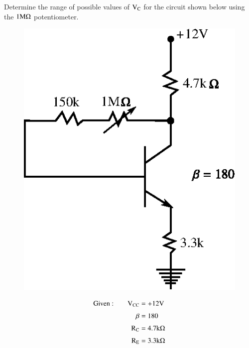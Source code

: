 \begin{problem}\label{prob3.8}
Determine the range of possible values of $\textrm{V}_{\textrm{C}}$ for the circuit shown below using the $1\textrm{M}\Omega$ potentiometer.

\noindent
\begin{minipage}[c]{7cm}
\begin{figure}[H]
\centering
\includegraphics[scale=.87]{chap3/fig3.17.eps}
\end{figure}
\end{minipage}
\quad
\begin{minipage}[c]{7cm}
\begin{align*}
\text{Given~:}\qquad \textrm{V}_{\text{CC}} &= +12\textrm{V}\\[3pt]
\beta &= 180\\[3pt]
\textrm{R}_{\textrm{C}} &= 4.7\textrm{k}\Omega\\[3pt]
\textrm{R}_{\textrm{E}} &= 3.3\textrm{k}\Omega
\end{align*}
\end{minipage}
\end{problem}

